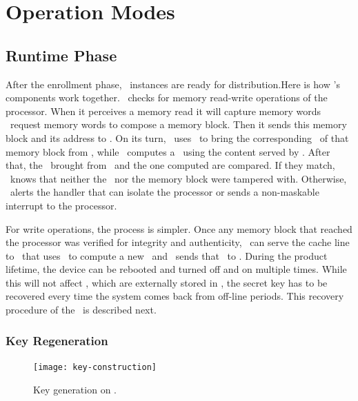 \subsubsection{\ptagmem}
\label{subsubsec:ptagmem}


\section{Operation Modes}
\label{sec:opmodes}



\subsection{Runtime Phase}
\label{subsec:runtimephase}
\def\fenroll{Figure \ref{fig:fuzzy-extractor} \subref{fig:fuzzy-enroll}}
\def\fregen{Figure \ref{fig:fuzzy-extractor} \subref{fig:fuzzy-regen}}
After the enrollment phase, \cshia~instances are ready for distribution.Here is how \cshia's components work together. \handler~checks for memory read-write operations of the processor. When it perceives a memory read it will capture memory words \andor~request memory words to compose a memory block. Then it sends this memory block and its address to \seceng. On its turn, \seceng~uses \pmmu~to bring the corresponding \ptag~of that memory block from \ptagmem, while \ptaggen~computes a \ptag~using the content served by \handler. After that, the \ptag~brought from \ptagmem~and the one computed are compared. If they match, \seceng~knows that neither the \ptag~nor the memory block were tampered with. Otherwise, \seceng~alerts the handler that can isolate the processor or sends a non-maskable interrupt to the processor.


For write operations, the process is simpler. Once any memory block that reached the processor was verified for integrity and authenticity, \handler~can serve the cache line to \seceng~that uses \ptaggen~to compute a new \ptag~and \pmmu~sends that \ptag~to \ptagmem.  During the product lifetime, the device can be rebooted and turned off and on multiple times. While this will not affect \ptags, which are externally stored in \ptagmem, the secret key has to be recovered every time the system comes back from off-line periods. This recovery procedure of the \fuzzy~is described next.

\subsubsection{Key Regeneration}
\label{subsubsec:Key-Regenation}
\begin{figure}[!t]
	\centering
	\texttt{[image: key-construction]}
	\caption{Key generation on \cshia.}
	\label{fig:key-construction}
\end{figure}

